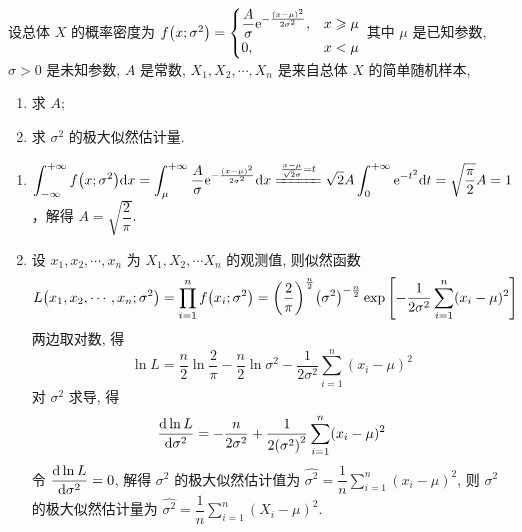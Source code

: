 \begin{example}[2019 数一]
    设总体 $X$ 的概率密度为 $f\qty(x;\sigma^2)=\begin{cases}
            \dfrac{A}{\sigma}\mathrm{e} ^{-\frac{(x-\mu)^2}{2\sigma^2}}, & x\geqslant \mu \\ 0,&x<\mu
        \end{cases}$ 其中 $\mu$ 是已知参数, $\sigma>0$ 是未知参数, $A$ 是常数, $X_1, X_2, \cdots, X_n$ 是来自总体 $X$ 的简单随机样本,
    \begin{enumerate}[label=(\arabic{*})]
        \item 求 $A$;
        \item 求 $\sigma^2$ 的极大似然估计量.
    \end{enumerate}
\end{example}
\begin{solution}
    \begin{enumerate}[label=(\arabic{*})]
        \item $ \displaystyle \int_{-\infty}^{+\infty} f\qty(x;\sigma^2) \dd x =\int_{\mu}^{+\infty} \dfrac{A}{\sigma}\e ^{-\frac{(x-\mu)^2}{2\sigma^2}} \dd x \xlongequal{\frac{x-\mu}{\sqrt{2}\sigma}=t}\sqrt{2}A\int_{0}^{+\infty} \e ^{-t^2} \dd t=\sqrt{\dfrac{\pi}{2}}A=1$，解得 $A=\sqrt{\dfrac{2}{\pi}}$.
        \item 设 $x_1, x_2, \cdots ,x_n$ 为 $X_1, X_2, \cdots X_n$ 的观测值, 则似然函数 $$
                  L\qty(x_1, x_2, \cdots ,x_n;\sigma^2)=\prod_{i=1}^{n}f\qty(x_i;\sigma^2)=\qty(\dfrac{2}{\pi})^{\frac{n}{2}}\qty(\sigma^2)^{-\frac{n}{2}}\exp\qty[-\dfrac{1}{2\sigma^2}\sum_{i=1}^{n} (x_i-\mu)^2]
              $$
              两边取对数, 得 $$
                  \ln L=\dfrac{n}{2}\ln\dfrac{2}{\pi}-\dfrac{n}{2}\ln\sigma^2-\dfrac{1}{2\sigma^2}\sum_{i=1}^{n} (x_i-\mu)^2
              $$
              对 $\sigma^2$ 求导, 得 $$
                  \dv{\ln L}{\sigma^2}=-\dfrac{n}{2\sigma^2}+\dfrac{1}{2\qty(\sigma^2)^2}\sum_{i=1}^{n} (x_i-\mu)^2
              $$
              令 $\displaystyle \dv{\ln L}{\sigma^2}=0$, 解得 $\sigma^2$ 的极大似然估计值为 $\displaystyle \hat{\sigma^2}=\dfrac{1}{n}\sum_{i=1}^{n} (x_i-\mu)^2$, 则 $\sigma^2$ 的极大似然估计量为 $\displaystyle \hat{\sigma^2}=\dfrac{1}{n}\sum_{i=1}^{n} (X_i-\mu)^2$.
    \end{enumerate}
\end{solution}

